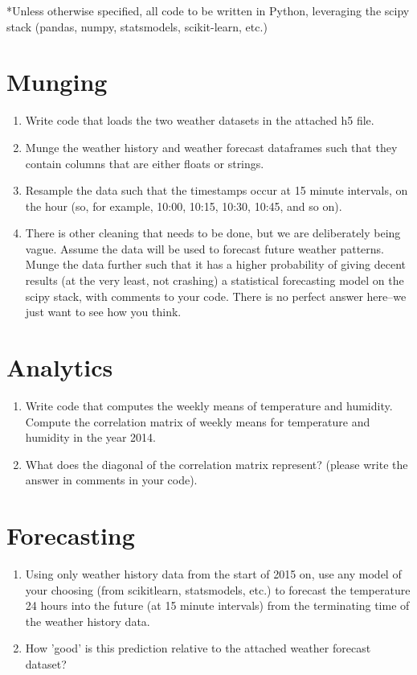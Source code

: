 \documentclass[12pt]{article}
\author{David Karapetyan}
\begin{document}
*Unless otherwise specified, all code to be written in Python, leveraging the
scipy stack (pandas, numpy, statsmodels, scikit-learn, etc.)
\section*{Munging}
\begin{enumerate}[1)]
	\item
		Write code that loads the two weather datasets in the attached h5 file.
	\item
		Munge the weather history and weather forecast dataframes such that
		they contain columns that are either floats or strings. 
	\item Resample the data such that the timestamps occur at 15 minute intervals,
		on the hour (so, for example, 10:00, 10:15, 10:30, 10:45, and so on). 
	\item 
		There is other
		cleaning that needs to be done, but we are deliberately
		being vague. Assume the data will be used to forecast future weather
		patterns. Munge the data further such that it has a higher probability of 
		giving decent results (at the very least, not crashing) a statistical forecasting model on the scipy stack, 
		with comments to your code. There is no perfect answer here--we just want 
		to see how you think.
\end{enumerate}

\section*{Analytics}
\begin{enumerate}[1)]
	\item 
		Write code that computes the weekly means of temperature and humidity. 
		Compute the correlation matrix of weekly means for temperature and humidity
		in the year 2014. 
	\item What does the diagonal of the correlation matrix represent?
		(please write the answer in comments in your code). 
\end{enumerate}
\section*{Forecasting}
\begin{enumerate}[1)]
	\item Using only weather history data from the start of 2015 on, use any
		model of your choosing (from scikitlearn, statsmodels, etc.) to forecast
		the temperature 24 hours into the future (at 15 minute intervals) from the
		terminating time of the weather history data. 
	\item How 'good' is this prediction
		relative to the attached weather forecast dataset?
\end{enumerate}
\end{document}
